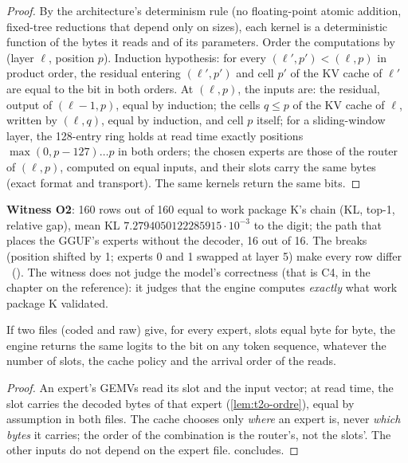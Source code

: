 \begin{proof}
By the architecture's determinism rule (no floating-point atomic addition, fixed-tree reductions that depend only on sizes), each kernel is a deterministic function of the bytes it reads and of its parameters. Order the computations by (layer $\ell$, position $p$). Induction hypothesis: for every $(\ell', p') < (\ell, p)$ in product order, the residual entering $(\ell', p')$ and cell $p'$ of the KV cache of $\ell'$ are equal to the bit in both orders. At $(\ell, p)$, the inputs are: the residual, output of $(\ell - 1, p)$, equal by induction; the cells $q \le p$ of the KV cache of $\ell$, written by $(\ell, q)$, equal by induction, and cell $p$ itself; for a sliding-window layer, the 128-entry ring holds at read time exactly positions $\max(0, p - 127) \ldots p$ in both orders; the chosen experts are those of the router of $(\ell, p)$, computed on equal inputs, and their slots carry the same bytes (exact format and transport). The same kernels return the same bits.
\end{proof}

\textbf{Witness O2}: 160 rows out of 160 equal to work package K's chain (KL, top-1, relative gap), mean KL $7.2794050122285915\cdot10^{-3}$ to the digit; the path that places the GGUF's experts without the decoder, 16 out of 16. The breaks (position shifted by 1; experts 0 and 1 swapped at layer 5) make every row differ \mes~(). The witness does not judge the model's correctness (that is C4, in the chapter on the reference): it judges that the engine computes \emph{exactly} what work package K validated.

\begin{proposition}\label{prop:t2o-c3}
If two files (coded and raw) give, for every expert, slots equal byte for byte, the engine returns the same logits to the bit on any token sequence, whatever the number of slots, the cache policy and the arrival order of the reads.
\end{proposition}

\begin{proof}
An expert's GEMVs read its slot and the input vector; at read time, the slot carries the decoded bytes of that expert (\cref{lem:t2o-ordre}), equal by assumption in both files. The cache chooses only \emph{where} an expert is, never \emph{which bytes} it carries; the order of the combination is the router's, not the slots'. The other inputs do not depend on the expert file.  concludes.
\end{proof}

